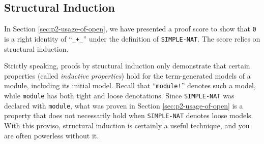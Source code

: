 \documentclass[a4paper]{memoir}
\begin{document}
\subsection{Structural Induction}\label{sec:p2-proof-by-induction}

In Section \ref{sec:p2-usage-of-open}, we have presented a
proof score to show that \verb|0| is a right identity of ``\verb|_+_|''
under the definition of \verb|SIMPLE-NAT|. The score relies on
structural induction.

Strictly speaking, proofs by structural induction only demonstrate
that certain properties (called
{\em inductive properties}) hold for
the term-generated models of a module, including its initial model.
Recall that ``\verb|module!|'' denotes such a
model, while \verb|module| has both tight and loose denotations.
Since \verb|SIMPLE-NAT| was declared with \verb|module|, what was proven
in Section \ref{sec:p2-usage-of-open} is a property that does not
necessarily hold when \verb|SIMPLE-NAT| denotes loose models.
With this proviso, structural induction is certainly a useful
technique, and you are often powerless without it.
\end{document}
